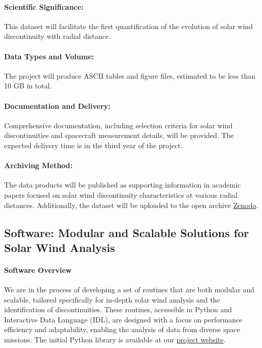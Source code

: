 \documentclass[
  letterpaper,
  DIV=11,
  numbers=noendperiod]{scrartcl}
\let\oldparagraph\paragraph
\renewcommand{\paragraph}[1]{\oldparagraph{#1}\mbox{}}
\begin{document}
\paragraph{Scientific Significance:}\label{scientific-significance}

This dataset will facilitate the first quantification of the evolution
of solar wind discontinuity with radial distance.

\paragraph{Data Types and Volume:}\label{data-types-and-volume}

The project will produce ASCII tables and figure files, estimated to be
less than 10 GB in total.

\paragraph{Documentation and
Delivery:}\label{documentation-and-delivery}

Comprehensive documentation, including selection criteria for solar wind
discontinuities and spacecraft measurement details, will be provided.
The expected delivery time is in the third year of the project.

\paragraph{Archiving Method:}\label{archiving-method}

The data products will be published as supporting information in
academic papers focused on solar wind discontinuity characteristics at
various radial distances. Additionally, the dataset will be uploaded to
the open archive \href{https://zenodo.org/}{Zenodo}.

\subsection{Software: Modular and Scalable Solutions for Solar Wind
Analysis}\label{software-modular-and-scalable-solutions-for-solar-wind-analysis}

\paragraph{Software Overview}\label{software-overview}

We are in the process of developing a set of routines that are both
modular and scalable, tailored specifically for in-depth solar wind
analysis and the identification of discontinuities. These routines,
accessible in Python and Interactive Data Language (IDL), are designed
with a focus on performance efficiency and adaptability, enabling the
analysis of data from diverse space missions. The initial Python library
is available at our \href{https://beforerr.github.io/ids_finder}{project
website}.
\end{document}
